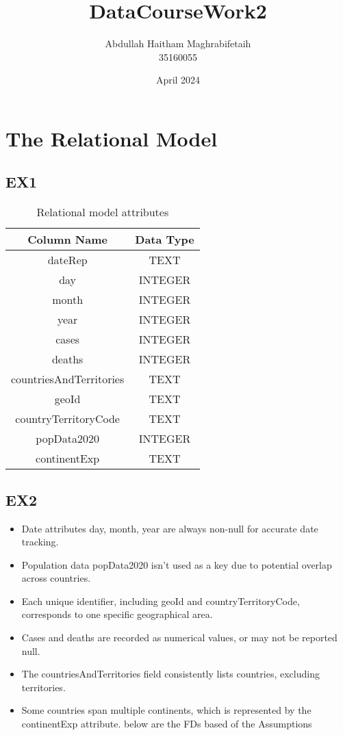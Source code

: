 \documentclass[10pt]{article}
\title{DataCourseWork2}
\author{Abdullah Haitham Maghrabifetaih\\ 35160055}
\date{April 2024}
\begin{document}
\maketitle

\newpage
\section{The Relational Model}
\subsection{EX1}

\begin{table}[h!]
\caption{Relational model attributes}
\centering 
\begin{tabular}{|c|c|}
\hline
\textbf{Column Name} & \textbf{Data Type} \\ \hline

dateRep & TEXT \\ \hline
day & INTEGER \\ \hline
month & INTEGER \\ \hline
year & INTEGER \\ \hline
cases & INTEGER \\ \hline
deaths & INTEGER \\ \hline
countriesAndTerritories & TEXT \\ \hline
geoId & TEXT \\ \hline
countryTerritoryCode & TEXT \\ \hline
popData2020 & INTEGER \\ \hline
continentExp & TEXT \\ \hline
\end{tabular}
\label{tab:covidreporting}
\end{table}

\subsection{EX2}



\begin{itemize}
\renewcommand\labelitemi{-}
 \item Date attributes day, month, year are always non-null for accurate date tracking.
 \item Population data popData2020 isn't used as a key due to potential overlap across countries.
 \item Each unique identifier, including geoId and countryTerritoryCode, corresponds to one specific geographical area.
 \item Cases and deaths are recorded as numerical values, or may not be reported null.
 \item The countriesAndTerritories field consistently lists countries, excluding territories.
 \item Some countries span multiple continents, which is represented by the continentExp attribute.
 below are the FDs based of the Assumptions 
\end{itemize}
\end{document}
